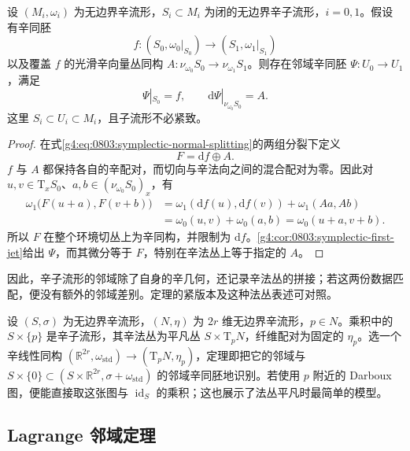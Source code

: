 \begin{theorem}[辛子流形邻域定理]\label{g4:thm:0803:symplectic-neighborhood}
	设 \((M_i,\omega_i)\) 为无边界辛流形，\(S_i\subset M_i\) 为闭的无边界辛子流形，\(i=0,1\)。假设有辛同胚
	\[
		f:(S_0,\omega_0|_{S_0})\longrightarrow(S_1,\omega_1|_{S_1})
	\]
	以及覆盖 \(f\) 的光滑辛向量丛同构 \(A:\nu_{\omega_0}S_0\to\nu_{\omega_1}S_1\)。则存在邻域辛同胚 \(\Psi:U_0\to U_1\)，满足
	\[
		\Psi|_{S_0}=f,\qquad
		\mathrm{d}\Psi|_{\nu_{\omega_0}S_0}=A.
	\]
	这里 \(S_i\subset U_i\subset M_i\)，且子流形不必紧致。
\end{theorem}
\begin{proof}
	在式\eqref{g4:eq:0803:symplectic-normal-splitting}的两组分裂下定义
	\[
		F=\mathrm{d}f\oplus A.
	\]
	\(f\) 与 \(A\) 都保持各自的辛配对，而切向与辛法向之间的混合配对为零。因此对 \(u,v\in\mathrm{T}_xS_0\)、\(a,b\in(\nu_{\omega_0}S_0)_x\)，有
	\begin{align*}
		\omega_1\bigl(F(u+a),F(v+b)\bigr)
		&=\omega_1(\mathrm{d}f(u),\mathrm{d}f(v))+\omega_1(Aa,Ab)\\
		&=\omega_0(u,v)+\omega_0(a,b)
		=\omega_0(u+a,v+b).
	\end{align*}
	所以 \(F\) 在整个环境切丛上为辛同构，并限制为 \(\mathrm{d}f\)。\cref{g4:cor:0803:symplectic-first-jet}给出 \(\Psi\)，而其微分等于 \(F\)，特别在辛法丛上等于指定的 \(A\)。
\end{proof}

因此，辛子流形的邻域除了自身的辛几何，还记录辛法丛的拼接；若这两份数据匹配，便没有额外的邻域差别。定理的紧版本及这种法丛表述可对照\cite[定理1.11，第91--92页]{Cannas2006Symplectic}。

\begin{example}\label{g4:exm:0803:product-neighborhood}
	设 \((S,\sigma)\) 为无边界辛流形，\((N,\eta)\) 为 \(2r\) 维无边界辛流形，\(p\in N\)。乘积中的 \(S\times\{p\}\) 是辛子流形，其辛法丛为平凡丛 \(S\times\mathrm{T}_pN\)，纤维配对为固定的 \(\eta_p\)。选一个辛线性同构 \((\mathbb R^{2r},\omega_{\mathrm{std}})\to(\mathrm{T}_pN,\eta_p)\)，定理即把它的邻域与 \(S\times\{0\}\subset(S\times\mathbb R^{2r},\sigma+\omega_{\mathrm{std}})\) 的邻域辛同胚地识别。若使用 \(p\) 附近的 Darboux 图，便能直接取这张图与 \(\operatorname{id}_S\) 的乘积；这也展示了法丛平凡时最简单的模型。
\end{example}

\subsection{Lagrange 邻域定理}
\label{g4:subsec:0803:04}

